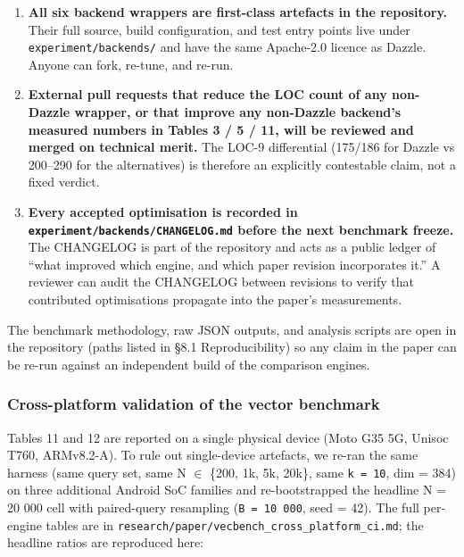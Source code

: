 \begin{itemize}
  \begin{enumerate}
  \def\labelenumi{\arabic{enumi}.}
  \tightlist
  \item
    \textbf{All six backend wrappers are first-class artefacts in the
    repository.} Their full source, build configuration, and test entry points
    live under \texttt{experiment/backends/} and have the same Apache-2.0
    licence as Dazzle. Anyone can fork, re-tune, and re-run.
  \item
    \textbf{External pull requests that reduce the LOC count of any non-Dazzle
    wrapper, or that improve any non-Dazzle backend's measured numbers in Tables
    3 / 5 / 11, will be reviewed and merged on technical merit.} The LOC-9
    differential (175/186 for Dazzle vs 200--290 for the alternatives) is
    therefore an explicitly contestable claim, not a fixed verdict.
  \item
    \textbf{Every accepted optimisation is recorded in
    \texttt{experiment/backends/CHANGELOG.md} before the next benchmark freeze.}
    The CHANGELOG is part of the repository and acts as a public ledger of
    ``what improved which engine, and which paper revision incorporates it.'' A
    reviewer can audit the CHANGELOG between revisions to verify that
    contributed optimisations propagate into the paper's measurements.
  \end{enumerate}

  The benchmark methodology, raw JSON outputs, and analysis scripts are open in
  the repository (paths listed in §8.1 Reproducibility) so any claim in the
  paper can be re-run against an independent build of the comparison engines.
\end{itemize}

\subsubsection{Cross-platform validation of the vector
benchmark}\label{cross-platform-validation-of-the-vector-benchmark}

Tables 11 and 12 are reported on a single physical device (Moto G35 5G, Unisoc
T760, ARMv8.2-A). To rule out single-device artefacts, we re-ran the same
harness (same query set, same N \(\in\) \{200, 1k, 5k, 20k\}, same
\texttt{k\ =\ 10}, dim = 384) on three additional Android SoC families and
re-bootstrapped the headline N = 20 000 cell with paired-query resampling
(\texttt{B\ =\ 10\ 000}, seed = 42). The full per-engine tables are in
\texttt{research/paper/vecbench\_cross\_platform\_ci.md}; the headline ratios
are reproduced here:

